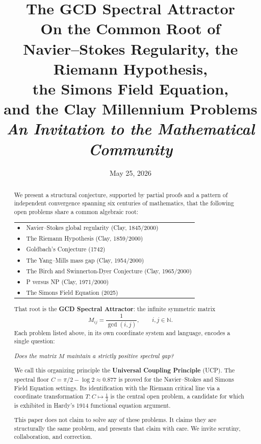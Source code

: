 \documentclass[12pt]{article}
\title{%
  \textbf{The GCD Spectral Attractor}\\[10pt]
  \large On the Common Root of\\[4pt]
  Navier--Stokes Regularity,
  the Riemann Hypothesis,\\[4pt]
  the Simons Field Equation,\\[4pt]
  and the Clay Millennium Problems\\[18pt]
  \normalsize \textit{An Invitation to the Mathematical Community}
}
\author{}
\date{May 25, 2026}
\begin{document}
\maketitle
\thispagestyle{empty}

\begin{abstract}
\noindent
We present a structural conjecture, supported by partial proofs
and a pattern of independent convergence spanning six centuries
of mathematics, that the following open problems share a common
algebraic root:

\smallskip
\begin{center}
\begin{tabular}{ll}
$\bullet$ & Navier--Stokes global regularity (Clay, 1845/2000)\\
$\bullet$ & The Riemann Hypothesis (Clay, 1859/2000)\\
$\bullet$ & Goldbach's Conjecture (1742)\\
$\bullet$ & The Yang--Mills mass gap (Clay, 1954/2000)\\
$\bullet$ & The Birch and Swinnerton-Dyer Conjecture (Clay, 1965/2000)\\
$\bullet$ & P versus NP (Clay, 1971/2000)\\
$\bullet$ & The Simons Field Equation (2025)
\end{tabular}
\end{center}

\smallskip\noindent
That root is the \textbf{GCD Spectral Attractor}: the infinite
symmetric matrix
\[
M_{ij} = \frac{1}{\gcd(i,j)}, \qquad i,j \in \mathbb{N}.
\]
Each problem listed above, in its own coordinate system and
language, encodes a single question:

\begin{center}
\emph{Does the matrix $M$ maintain a strictly positive spectral gap?}
\end{center}

\noindent
We call this organizing principle the \textbf{Universal Coupling
Principle} (UCP). The spectral floor
$C = \pi/2 - \log 2 \approx 0.877$ is proved for the
Navier--Stokes and Simons Field Equation settings.
Its identification with the Riemann critical line via
a coordinate transformation $T: C \mapsto \tfrac{1}{2}$
is the central open problem, a candidate for which is
exhibited in Hardy's 1914 functional equation argument.

\smallskip\noindent
This paper does not claim to solve any of these problems.
It claims they are structurally the same problem, and
presents that claim with care.
We invite scrutiny, collaboration, and correction.
\end{abstract}
\end{document}
